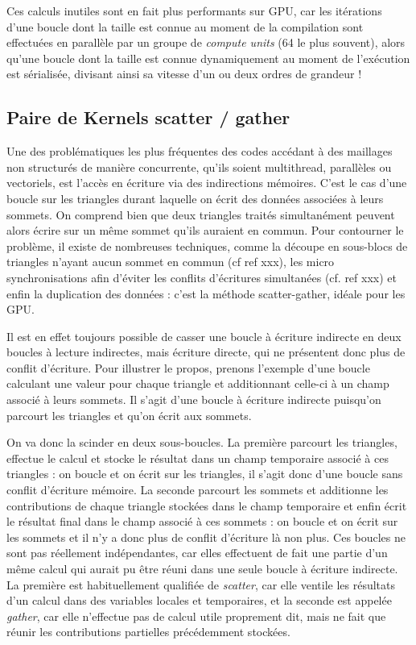 \documentclass[a4paper,12pt]{article}
\begin{document}
Ces calculs inutiles sont en fait plus performants sur GPU, car les itérations d'une boucle dont la taille est connue au moment de la compilation sont effectuées en parallèle par un groupe de \emph{compute units} (64 le plus souvent), alors qu'une boucle dont la taille est connue dynamiquement au moment de l'exécution est sérialisée, divisant ainsi sa vitesse d'un ou deux ordres de grandeur !


\subsection{Paire de Kernels scatter / gather}
Une des problématiques les plus fréquentes des codes accédant à des maillages non structurés de manière concurrente, qu'ils soient multithread, parallèles ou vectoriels, est l'accès en écriture via des indirections mémoires.
C'est le cas d'une boucle sur les triangles durant laquelle on écrit des données associées à leurs sommets.
On comprend bien que deux triangles traités simultanément peuvent alors écrire sur un même sommet qu'ils auraient en commun.
Pour contourner le problème, il existe de nombreuses techniques, comme la découpe en sous-blocs de triangles n'ayant aucun sommet en commun (cf ref xxx), les micro synchronisations afin d'éviter les conflits d'écritures simultanées (cf. ref xxx) et enfin la duplication des données : c'est la méthode scatter-gather, idéale pour les GPU.

Il est en effet toujours possible de casser une boucle à écriture indirecte en deux boucles à lecture indirectes, mais écriture directe, qui ne présentent donc plus de conflit d'écriture.
Pour illustrer le propos, prenons l'exemple d'une boucle calculant une valeur pour chaque triangle et additionnant celle-ci à un champ associé à leurs sommets.
Il s'agit d'une boucle à écriture indirecte puisqu'on parcourt les triangles et qu'on écrit aux sommets.

On va donc la scinder en deux sous-boucles.
La première parcourt les triangles, effectue le calcul et stocke le résultat dans un champ temporaire associé à ces triangles : on boucle et on écrit sur les triangles, il s'agit donc d'une boucle sans conflit d'écriture mémoire.
La seconde parcourt les sommets et additionne les contributions de chaque triangle stockées dans le champ temporaire et enfin écrit le résultat final dans le champ associé à ces sommets : on boucle et on écrit sur les sommets et il n'y a donc plus de conflit d'écriture là non plus.
Ces boucles ne sont pas réellement indépendantes, car elles effectuent de fait une partie d'un même calcul qui aurait pu être réuni dans une seule boucle à écriture indirecte.
La première est habituellement qualifiée de \emph{scatter}, car elle ventile les résultats d'un calcul dans des variables locales et temporaires, et la seconde est appelée \emph{gather}, car elle n'effectue pas de calcul utile proprement dit, mais ne fait que réunir les contributions partielles précédemment stockées.
\end{document}
